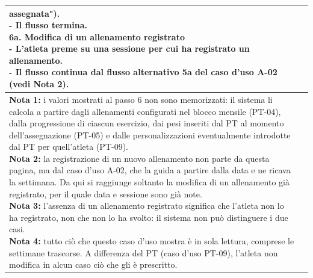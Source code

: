 \documentclass[../../../../SoftwareRequirementsSpecification.tex]{subfiles}
\begin{document}
\begin{tabularx}{\textwidth}{|l|X|}
{    assegnata"). \newline
    - Il flusso termina. \newline
    \textbf{6a. Modifica di un allenamento registrato} \newline
    - L'atleta preme su una sessione per cui ha registrato un
    allenamento. \newline
    - Il flusso continua dal flusso alternativo 5a del caso d'uso
    A-02 (vedi Nota 2).
  } \\ \hline
  \ucnote{
    \textbf{Nota 1:} i valori mostrati al passo 6 non sono
    memorizzati: il sistema li calcola a partire dagli allenamenti
    configurati nel blocco mensile (PT-04), dalla progressione di
    ciascun esercizio, dai pesi inseriti dal PT al momento
    dell'assegnazione (PT-05) e dalle personalizzazioni
    eventualmente introdotte dal PT per quell'atleta
    (PT-09).\newline
    \textbf{Nota 2:} la registrazione di un nuovo allenamento non
    parte da questa pagina, ma dal caso d'uso A-02, che la guida a
    partire dalla data e ne ricava la settimana. Da qui si raggiunge
    soltanto la modifica di un allenamento già registrato, per il
    quale data e sessione sono già note.\newline
    \textbf{Nota 3:} l'assenza di un allenamento registrato significa
    che l'atleta non lo ha registrato, non che non lo ha svolto: il
    sistema non può distinguere i due casi.\newline
    \textbf{Nota 4:} tutto ciò che questo caso d'uso mostra è in sola
    lettura, comprese le settimane trascorse. A differenza del PT
    (caso d'uso PT-09), l'atleta non modifica in alcun caso ciò che
    gli è prescritto.
  } \\ \hline
\end{tabularx}
\end{document}
